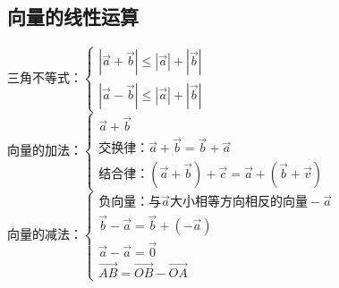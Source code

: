 \begin{minipage}{.7\textwidth}
\subsection{向量的线性运算}
	$\mbox{三角不等式：}\begin{cases}
	|\overrightarrow{a}+\overrightarrow{b}|\leqslant|\overrightarrow{a}|+|\overrightarrow{b}|\\
	|\overrightarrow{a}-\overrightarrow{b}|\leqslant|\overrightarrow{a}|+|\overrightarrow{b}|
\end{cases}$\\
	$\mbox{向量的加法：}\begin{cases}
		\overrightarrow{a}+\overrightarrow{b}\\
		\mbox{交换律：}\overrightarrow{a}+\overrightarrow{b}=\overrightarrow{b}+\overrightarrow{a}\\
		\mbox{结合律：}(\overrightarrow{a}+\overrightarrow{b})+\overrightarrow{c}=\overrightarrow{a}+(\overrightarrow{b}+\overrightarrow{v})
	\end{cases}$\\
	$\mbox{向量的减法：}\begin{cases}
		\mbox{负向量：}\mbox{与}\overrightarrow{a}\mbox{大小相等方向相反的向量}-\overrightarrow{a}\\
		\overrightarrow{b}-\overrightarrow{a}=\overrightarrow{b}+(-\overrightarrow{a})\\
		\overrightarrow{a}-\overrightarrow{a}=\overrightarrow{0}\\
		\overrightarrow{AB}=\overrightarrow{OB}-\overrightarrow{OA}
	\end{cases}$
\end{minipage}
\hfill
